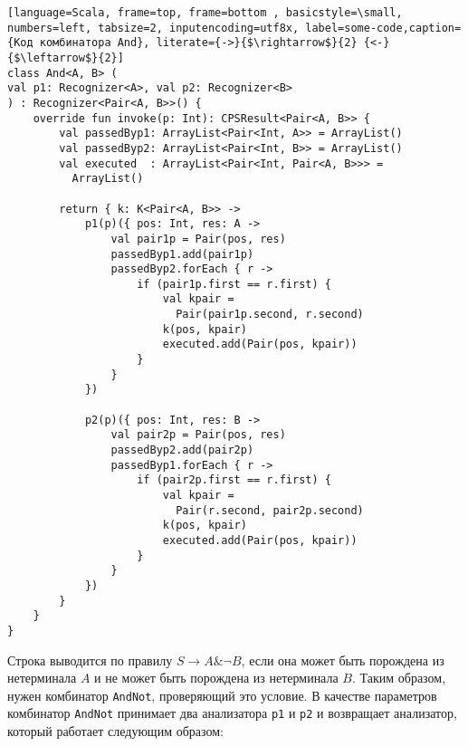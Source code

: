 \begin{lstlisting}[language=Scala, frame=top, frame=bottom , basicstyle=\small, numbers=left, tabsize=2, inputencoding=utf8x, label=some-code,caption={Код комбинатора And}, literate={->}{$\rightarrow$}{2} {<-}{$\leftarrow$}{2}]
class And<A, B> (
val p1: Recognizer<A>, val p2: Recognizer<B>
) : Recognizer<Pair<A, B>>() {
    override fun invoke(p: Int): CPSResult<Pair<A, B>> {
        val passedByp1: ArrayList<Pair<Int, A>> = ArrayList()
        val passedByp2: ArrayList<Pair<Int, B>> = ArrayList()
        val executed  : ArrayList<Pair<Int, Pair<A, B>>> =
          ArrayList()

        return { k: K<Pair<A, B>> ->
            p1(p)({ pos: Int, res: A ->
                val pair1p = Pair(pos, res)
                passedByp1.add(pair1p)
                passedByp2.forEach { r ->
                    if (pair1p.first == r.first) {
                        val kpair =
                          Pair(pair1p.second, r.second)
                        k(pos, kpair)
                        executed.add(Pair(pos, kpair))
                    }
                }
            })

            p2(p)({ pos: Int, res: B ->
                val pair2p = Pair(pos, res)
                passedByp2.add(pair2p)
                passedByp1.forEach { r ->
                    if (pair2p.first == r.first) {
                        val kpair =
                          Pair(r.second, pair2p.second)
                        k(pos, kpair)
                        executed.add(Pair(pos, kpair))
                    }
                }
            })
        }
    }
}
\end{lstlisting}
Строка выводится по правилу $S \rightarrow A \& \neg B$, если она может быть порождена из нетерминала $A$ и не может быть порождена из нетерминала $B$. Таким образом, нужен комбинатор \lstinline[language=Scala]{AndNot}, проверяющий это условие.
В качестве параметров комбинатор \lstinline[language=Scala]{AndNot} принимает два анализатора \lstinline[language=Scala]{p1} и \lstinline[language=Scala]{p2} и возвращает анализатор, который работает следующим образом:
